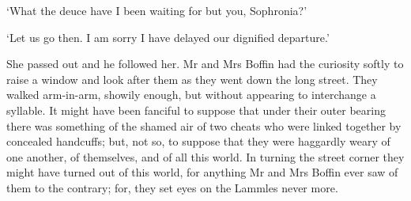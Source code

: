‘What the deuce have I been waiting for but you, Sophronia?’

‘Let us go then. I am sorry I have delayed our dignified departure.’

She passed out and he followed her. Mr and Mrs Boffin had the curiosity
softly to raise a window and look after them as they went down the long
street. They walked arm-in-arm, showily enough, but without appearing
to interchange a syllable. It might have been fanciful to suppose that
under their outer bearing there was something of the shamed air of two
cheats who were linked together by concealed handcuffs; but, not so, to
suppose that they were haggardly weary of one another, of themselves,
and of all this world. In turning the street corner they might have
turned out of this world, for anything Mr and Mrs Boffin ever saw of
them to the contrary; for, they set eyes on the Lammles never more.




